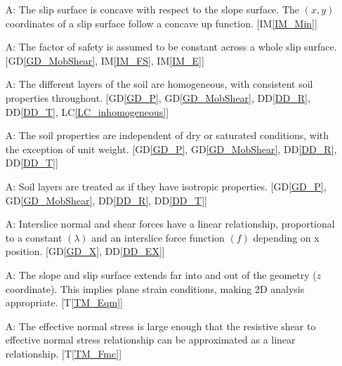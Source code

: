 \documentclass[12pt]{article}
\newcounter{assumpnum} %
\newcommand{\tref}[1]{T\ref{#1}}
\newcommand{\iref}[1]{IM\ref{#1}}
\newcommand{\ddref}[1]{DD\ref{#1}}
\newcommand{\dref}[1]{GD\ref{#1}}
\newcommand{\lcref}[1]{LC\ref{#1}}
\begin{document}
\begin{enumerate}[label=A\arabic*:,ref={\arabic*}]
\item [A\refstepcounter{assumpnum}\theassumpnum: \label{A_Concave}] The
  slip surface is concave with respect to the slope surface. The $(x,y)$
  coordinates of a slip surface follow a concave up function. [\iref{IM_Min}]

\item [A\refstepcounter{assumpnum}\theassumpnum: \label{A_Constant}] The factor 
of safety is assumed to be constant across a whole slip surface. 
[\dref{GD_MobShear}, \iref{IM_FS}, \iref{IM_E}]

\item [A\refstepcounter{assumpnum}\theassumpnum: \label{A_Homo}] The
  different layers of the soil are homogeneous, with consistent soil
  properties throughout. [\dref{GD_P}, \dref{GD_MobShear}, \ddref{DD_R}, 
  \ddref{DD_T}, \lcref{LC_inhomogeneous}]
  
\item [A\refstepcounter{assumpnum}\theassumpnum: \label{A_Saturated}] The soil 
properties are independent of dry or saturated conditions, with the exception 
of unit weight. [\dref{GD_P}, \dref{GD_MobShear}, \ddref{DD_R}, 
\ddref{DD_T}]

\item [A\refstepcounter{assumpnum}\theassumpnum: \label{A_Isotropic}]
  Soil layers are treated as if they have isotropic properties. [\dref{GD_P}, 
  \dref{GD_MobShear}, \ddref{DD_R}, \ddref{DD_T}]
  
\item [A\refstepcounter{assumpnum}\theassumpnum: \label{A_Base}]
  Interslice normal and shear forces have a linear relationship,
  proportional to a constant $\left({\lambda}\right)$ and an
  interslice force function $\left({f}\right)$ depending on x
  position. [\dref{GD_X}, \ddref{DD_EX}]
  
\item [A\refstepcounter{assumpnum}\theassumpnum: \label{A_2D}] The
  slope and slip surface extends far into and out of the geometry ($z$
  coordinate). This implies plane strain conditions, making 2D
  analysis appropriate. [\tref{TM_Eqm}]

\item [A\refstepcounter{assumpnum}\theassumpnum: \label{A_Lin}] The
  effective normal stress is large enough that the resistive shear to
  effective normal stress relationship can be approximated as a linear
  relationship. [\tref{TM_Fmc}]


\end{enumerate}
\end{document}
